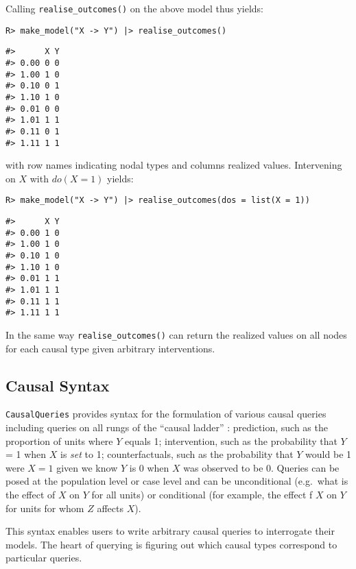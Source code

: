 \documentclass[
  11pt,
  article]{jss}
\begin{document}
Calling \texttt{realise\_outcomes()} on the above model thus yields:

\begin{verbatim}
R> make_model("X -> Y") |> realise_outcomes()
\end{verbatim}

\begin{verbatim}
#>      X Y
#> 0.00 0 0
#> 1.00 1 0
#> 0.10 0 1
#> 1.10 1 0
#> 0.01 0 0
#> 1.01 1 1
#> 0.11 0 1
#> 1.11 1 1
\end{verbatim}

with row names indicating nodal types and columns realized values.
Intervening on \(X\) \citep[see][]{pearl_causality_2009} with
\(do(X=1)\) yields:

\begin{verbatim}
R> make_model("X -> Y") |> realise_outcomes(dos = list(X = 1))
\end{verbatim}

\begin{verbatim}
#>      X Y
#> 0.00 1 0
#> 1.00 1 0
#> 0.10 1 0
#> 1.10 1 0
#> 0.01 1 1
#> 1.01 1 1
#> 0.11 1 1
#> 1.11 1 1
\end{verbatim}

In the same way \texttt{realise\_outcomes()} can return the realized
values on all nodes for each causal type given arbitrary interventions.

\hypertarget{sec-syntax}{%
\subsection{Causal Syntax}\label{sec-syntax}}

\texttt{CausalQueries} provides syntax for the formulation of various
causal queries including queries on all rungs of the ``causal ladder''
\citep{pearl_causality_2009}: prediction, such as the proportion of
units where \(Y\) equals 1; intervention, such as the probability that
\(Y\) = 1 when \(X\) is \emph{set} to 1; counterfactuals, such as the
probability that \(Y\) would be 1 were \(X=1\) given we know \(Y\) is 0
when \(X\) was observed to be 0. Queries can be posed at the population
level or case level and can be unconditional (e.g.~what is the effect of
\(X\) on \(Y\) for all units) or conditional (for example, the effect f
\(X\) on \(Y\) for units for whom \(Z\) affects \(X\)).

This syntax enables users to write arbitrary causal queries to
interrogate their models. The heart of querying is figuring out which
causal types correspond to particular queries.
\end{document}
